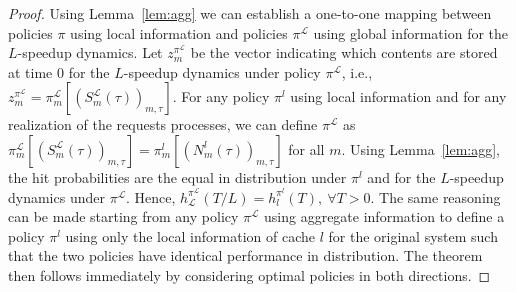 \documentclass[10pt, conference, letterpaper]{IEEEtran}
\begin{document}
\begin{proof}
Using Lemma~\ref{lem:agg} we can establish a one-to-one mapping between policies $\pi$ using local information and policies $\pi^\mathcal L$ using global information for the $L$-speedup dynamics. Let $z_m^{\pi^\mathcal L}$ be the vector indicating which contents are stored at time $0$ for the $L$-speedup dynamics under policy $\pi^\mathcal L$, i.e., $z_m^{\pi^\mathcal L}=\pi_m^\mathcal L[(S_m^\mathcal L(\tau))_{m,\tau}]$. For any policy $\pi^l$ using local information and for any realization of the requests processes, we can define $\pi^\mathcal L$ as $\pi_m^\mathcal L[(S_m^\mathcal L(\tau))_{m,\tau}]=\pi_m^l[(N_m^l(\tau))_{m,\tau}]$ for all $m$. Using Lemma~\ref{lem:agg}, the hit probabilities are the equal in distribution under $\pi^l$ and for the $L$-speedup dynamics under $\pi^\mathcal L$. Hence, $h_\mathcal L^{\pi^\mathcal L}(T/L)=h_l^{\pi^l}(T),\:\forall T>0$. The same reasoning can be made starting from any policy $\pi^\mathcal L$ using aggregate information to define a policy $\pi^l$ using only the local information of cache $l$ for the original system such that the two policies have identical performance in distribution. The theorem then follows immediately by considering optimal policies in both directions.
\end{proof}
\end{document}
